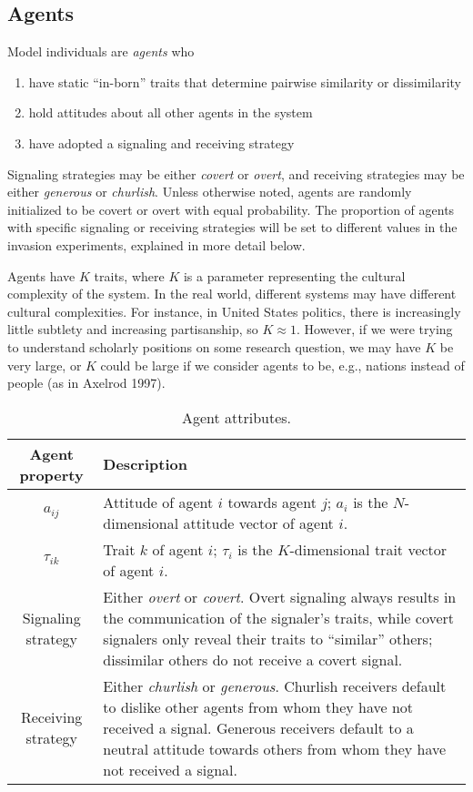 \documentclass[11pt,letterpaper]{article}
\begin{document}
\subsection{Agents}

Model individuals are \emph{agents} who 
\begin{enumerate}
  \item have static ``in-born'' traits that determine pairwise similarity or dissimilarity
  \item hold attitudes about all other agents in the system
  \item have adopted a signaling and receiving strategy
\end{enumerate}Signaling strategies
may be either \emph{covert} or \emph{overt}, and receiving strategies may be
either \emph{generous} or \emph{churlish}. Unless otherwise noted, agents are
randomly initialized to be covert or overt with equal probability. The 
proportion of agents with specific signaling or receiving strategies will be
set to different values in the invasion experiments, explained in more detail below.

Agents have $K$ traits, where $K$ is a parameter representing the cultural 
complexity of the system. In the real world, different systems may have 
different cultural complexities. For instance, in United States politics, there
is increasingly little subtlety and increasing partisanship, so $K \approx1 $.
However, if we were trying to understand scholarly positions on some research
question, we may have $K$ be very large, or $K$ could be large if we consider
agents to be, e.g., nations instead of people (as in Axelrod 1997).  

\begin{table}[H]
  \centering
  \begin{tabular}{cp{4.5in}}
    Agent property & Description \\
    \toprule
    $a_{ij}$   & Attitude of agent $i$ towards agent $j$; $a_i$ is the $N$-dimensional 
      attitude vector of agent $i$. \\
    $\tau_{ik}$ & Trait $k$ of agent $i$; $\tau_i$ is the $K$-dimensional trait vector of agent $i$. \\
    Signaling strategy & Either \emph{overt} or \emph{covert}. Overt signaling always
                         results in the communication of the signaler's traits,
                         while covert signalers only reveal their traits to 
                         ``similar'' others; dissimilar others do not receive a covert signal. \\
    Receiving strategy & Either \emph{churlish} or \emph{generous}. Churlish
                         receivers default to dislike other agents from whom they have
                         not received a signal. Generous receivers default to
                         a neutral attitude towards others from whom they have
                         not received a signal.
  \end{tabular}
  \caption{Agent attributes.}
  \label{tab:agentAttributes}
\end{table}
\end{document}
